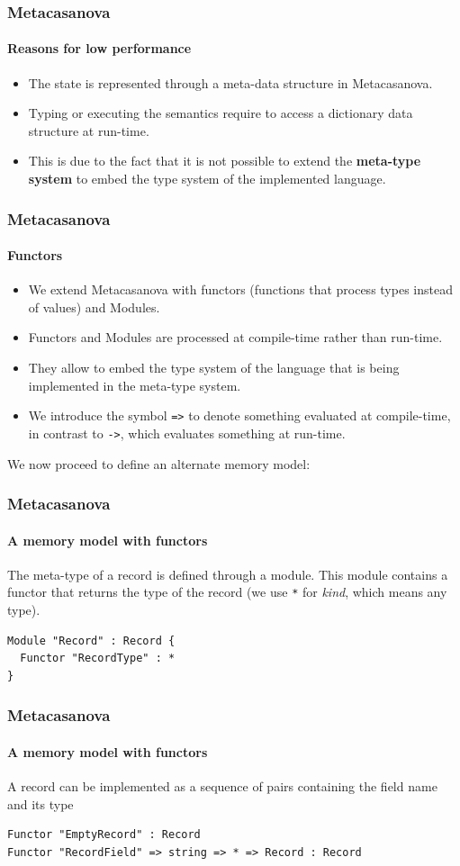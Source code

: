 \documentclass[10pt,a4paper]{beamer}
\begin{document}
\begin{frame}
\frametitle{Metacasanova}
\framesubtitle{Reasons for low performance}

\begin{itemize}
	\item The state is represented through a meta-data structure in Metacasanova.
	\item Typing or executing the semantics require to access a dictionary data structure at run-time.
	\item This is due to the fact that it is not possible to extend the \textbf{meta-type system} to embed the type system of the implemented language.
\end{itemize}
\end{frame}

\begin{frame}
\frametitle{Metacasanova}
\framesubtitle{Functors}

\begin{itemize}
	\item We extend Metacasanova with functors (functions that process types instead of values) and Modules.
	\item Functors and Modules are processed at compile-time rather than run-time.
	\item They allow to embed the type system of the language that is being implemented in the meta-type system.
	\item We introduce the symbol \texttt{=>} to denote something evaluated at compile-time, in contrast to \texttt{->}, which evaluates something at run-time.
\end{itemize}

We now proceed to define an alternate memory model:
\end{frame}

\begin{frame}[fragile]
\frametitle{Metacasanova}
\framesubtitle{A memory model with functors}

The meta-type of a record is defined through a module. This module contains a functor that returns the type of the record (we use \texttt{*} for \textit{kind}, which means any type).

\begin{lstlisting}
Module "Record" : Record {
  Functor "RecordType" : *
}
\end{lstlisting}
\end{frame}

\begin{frame}[fragile]
\frametitle{Metacasanova}
\framesubtitle{A memory model with functors}

A record can be implemented as a sequence of pairs containing the field name and its type

\begin{lstlisting}
Functor "EmptyRecord" : Record
Functor "RecordField" => string => * => Record : Record
\end{lstlisting}
\end{frame}
\end{document}
